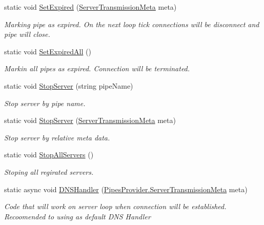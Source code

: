 \begin{DoxyCompactItemize}
static void \mbox{\hyperlink{class_pipes_provider_1_1_a_p_i_a9bfed3a9b5733c6a76235ec096c903e3}{Set\+Expired}} (\mbox{\hyperlink{class_pipes_provider_1_1_server_transmission_meta}{Server\+Transmission\+Meta}} meta)
\begin{DoxyCompactList}\small\item\em Marking pipe as expired. On the next loop tick connections will be disconnect and pipe will close. \end{DoxyCompactList}\item 
static void \mbox{\hyperlink{class_pipes_provider_1_1_a_p_i_a7e26cdf7c5b1f43abd155b4988f7bab1}{Set\+Expired\+All}} ()
\begin{DoxyCompactList}\small\item\em Markin all pipes as expired. Connection will be terminated. \end{DoxyCompactList}\item 
static void \mbox{\hyperlink{class_pipes_provider_1_1_a_p_i_a1a81c47121d56bca83bd3cbf058d6478}{Stop\+Server}} (string pipe\+Name)
\begin{DoxyCompactList}\small\item\em Stop server by pipe name. \end{DoxyCompactList}\item 
static void \mbox{\hyperlink{class_pipes_provider_1_1_a_p_i_aec56e2367941c5cbf6501298a946b41a}{Stop\+Server}} (\mbox{\hyperlink{class_pipes_provider_1_1_server_transmission_meta}{Server\+Transmission\+Meta}} meta)
\begin{DoxyCompactList}\small\item\em Stop server by relative meta data. \end{DoxyCompactList}\item 
static void \mbox{\hyperlink{class_pipes_provider_1_1_a_p_i_a5ec1b30c068984a8dbff3a5a4d41a8b7}{Stop\+All\+Servers}} ()
\begin{DoxyCompactList}\small\item\em Stoping all regirated servers. \end{DoxyCompactList}\item 
static async void \mbox{\hyperlink{class_pipes_provider_1_1_a_p_i_a90278e985fdf5488b1a60787fa1ff5ac}{D\+N\+S\+Handler}} (\mbox{\hyperlink{class_pipes_provider_1_1_server_transmission_meta}{Pipes\+Provider.\+Server\+Transmission\+Meta}} meta)
\begin{DoxyCompactList}\small\item\em Code that will work on server loop when connection will be established. Recoomended to using as default D\+NS Handler \end{DoxyCompactList}\end{DoxyCompactItemize}
